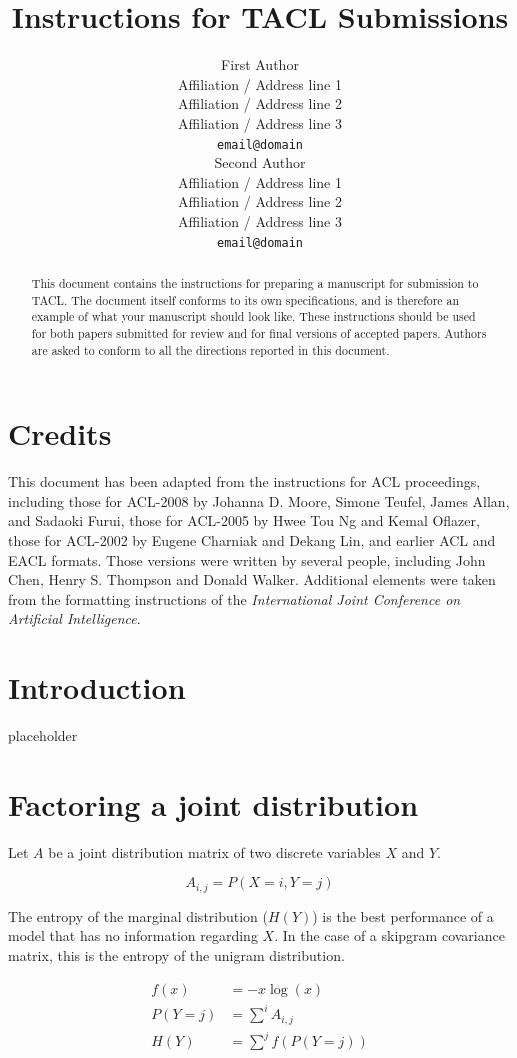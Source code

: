 \documentclass[11pt,letterpaper]{article}
\title{Instructions for TACL Submissions}
\author{First Author \\
  Affiliation / Address line 1 \\
  Affiliation / Address line 2 \\
  Affiliation / Address line 3 \\
  {\tt email@domain} \\\And
  Second Author \\
  Affiliation / Address line 1 \\
  Affiliation / Address line 2 \\
  Affiliation / Address line 3 \\
  {\tt email@domain} \\}
\date{}
\begin{document}
\maketitle
\begin{abstract}
  This document contains the instructions for preparing a manuscript for submission to TACL. The document itself conforms to its own specifications, and is therefore an example of what your manuscript should look like. These instructions should be used for both papers submitted for review and for final versions of accepted papers. Authors are asked to conform to all the directions reported in this document.
\end{abstract}

\section{Credits}

This document has been adapted from the instructions for ACL proceedings, including those for ACL-2008 by Johanna D. Moore, Simone Teufel, James Allan, and Sadaoki Furui, those for ACL-2005 by Hwee Tou Ng and Kemal Oflazer, those for ACL-2002 by Eugene Charniak and Dekang Lin, and earlier ACL and EACL formats. Those versions were written by several people, including John Chen, Henry S. Thompson and Donald Walker. Additional elements were taken from the formatting instructions of the {\em International Joint Conference on Artificial Intelligence}.

\section{Introduction}

placeholder
\section{Factoring a joint distribution}

Let $A$ be a joint distribution matrix of two discrete variables $X$ and $Y$.

$$A_{i,j}=P(X=i, Y=j)$$

The entropy of the marginal distribution ($H(Y)$) is the best performance of a model that has no information regarding $X$. In the case of a skipgram covariance matrix, this is the entropy of the unigram distribution.

\begin{align*}
f(x) &= -x \log(x) \\
P(Y=j) &= \sum^i A_{i, j} \\
H(Y) &=  \sum^j f(P(Y=j))
\end{align*}
\end{document}
